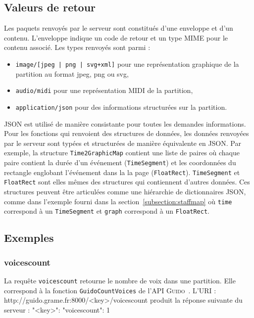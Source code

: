 \documentclass{article}
\newenvironment{code}		{\vspace{-2mm} \fontsize{8.5pt}{12pt}\selectfont \verbatim}{\endverbatim\vspace{-2mm}}
\newenvironment{mcode}		{\vspace{-2mm} \fontsize{10pt}{12pt}\selectfont \verbatim}{\endverbatim\vspace{-2mm}}
\newcommand{\icode}[1]		{{\small \texttt{#1}}}
\newcommand{\guido}		{\textsc{Guido}}
\begin{document}
\subsection{Valeurs de retour}\label{subsection:values}
Les paquets renvoyés par le serveur sont constitués d'une enveloppe et d'un contenu. L'enveloppe indique un code de retour et un type MIME pour le contenu associé. Les types renvoyés sont parmi :
\begin{itemize}
\item \icode{image/[jpeg | png | svg+xml]} pour une représentation graphique de la partition au format jpeg, png ou svg,
\item \icode{audio/midi} pour une représentation MIDI de la partition, 
\item \icode{application/json} pour des informations structurées sur la partition.
\end{itemize}
JSON est utilisé de manière consistante pour toutes les demandes informations. Pour les fonctions qui renvoient des structures de données, les données renvoyées par le serveur sont typées et structurées de manière équivalente en JSON.
Par exemple, la structure \verb=Time2GraphicMap= contient une liste de paires où chaque paire contient la durée d'un événement (\verb=TimeSegment=) et les coordonnées du rectangle englobant l'événement dans la la page (\verb=FloatRect=). \verb=TimeSegment= et \verb=FloatRect= sont elles mêmes des structures qui contiennent d'autres données. Ces structures peuvent être articulées comme une hiérarchie de dictionnaires JSON, comme dans l'exemple fourni dans la section~\ref{subsection:staffmap} où \verb=time= correspond à un \break \verb=TimeSegment= et \verb=graph= correspond à un \verb=FloatRect=.

\subsection{Exemples}
\subsubsection{voicescount}
La requête \verb=voicescount= retourne le nombre de voix dans une partition. Elle correspond à la fonction \verb=GuidoCountVoices= de l'API \guido\ . L'URI :
\begin{code}
  http://guido.grame.fr:8000/<key>/voicescount
\end{code}
produit la réponse suivante du serveur :
\begin{mcode}
  {
    "<key>": {
      "voicescount": 1
    }
  }
\end{mcode}
\end{document}
